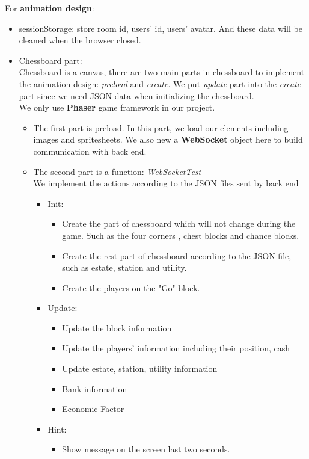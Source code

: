 \documentclass[a4paper,12pt]{article}
\begin{document}
For \textbf{animation design}:
\begin{itemize}
	\item sessionStorage: store room id, users' id, users' avatar. And these data will be cleaned when the browser closed.
	\item Chessboard part:\\
	Chessboard is a canvas, there are two main parts in chessboard to implement the animation design: \emph{preload} and \emph{create}. We put \emph{update} part into the \emph{create} part since we need JSON data when initializing the chessboard.\\
	We only use \textbf{Phaser} game framework in our project.
	\begin{itemize}
		\item The first part is preload. In this part, we load our elements including images and spritesheets. We also new a \textbf{WebSocket} object here to build communication with back end.
		\item The second part is a function: \emph{WebSocketTest}\\
		We implement the actions according to the JSON files sent by back end
		\begin{itemize}
			\item Init:
			\begin{itemize}
				\item Create the part of chessboard which will not change during the game. Such as the four corners , chest blocks and chance blocks.
				\item Create the rest part of chessboard according to the JSON file, such as estate, station and utility.
				\item Create the players on the "Go" block.
			\end{itemize}
		\item Update:
		\begin{itemize}
			\item Update the block information
			\item Update the players' information including their position, cash 
			\item Update estate, station, utility information
			\item Bank information
			\item Economic Factor
		\end{itemize}
	\item Hint:
	\begin{itemize}
		\item Show message on the screen last two seconds.

\end{itemize}
\end{itemize}
\end{itemize}
\end{itemize}
\end{document}
